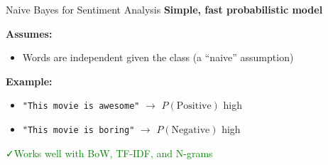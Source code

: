 \begin{frame}{Naive Bayes for Sentiment Analysis}
    \textbf{Simple, fast probabilistic model}

    \vspace{1em}
    \textbf{Assumes:}
    \begin{itemize}
        \item Words are independent given the class (a “naive” assumption)
    \end{itemize}

    \vspace{1em}
    \textbf{Example:}
    \begin{itemize}
        \item \texttt{"This movie is awesome"} $\rightarrow$ $P(\text{Positive})$ high
        \item \texttt{"This movie is boring"} $\rightarrow$ $P(\text{Negative})$ high
    \end{itemize}

    \vspace{1em}
    \textcolor{green}{\faCheck\enspace Works well with BoW, TF-IDF, and N-grams}
\end{frame}

